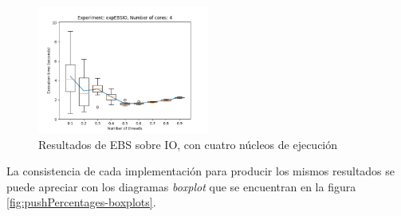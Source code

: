 \begin{figure}[H]
    \centering
    \includegraphics[width=0.5\textwidth]{images/pushPercentages/plots/expEBSIO-4.png}
    \caption{Resultados de EBS sobre IO, con cuatro núcleos de ejecución}
    \label{fig:pushPercentages-ebsio-4}
\end{figure}

La consistencia de cada implementación para producir los mismos resultados se puede apreciar con los diagramas \emph{boxplot} que se encuentran en la figura \ref{fig:pushPercentages-boxplots}.

